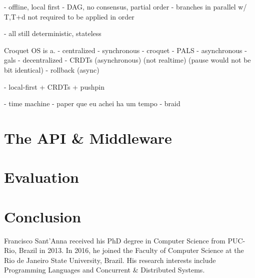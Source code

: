 \documentclass[10pt,journal,compsoc]{IEEEtran}
\begin{document}
- offline, local first
- DAG, no consensus, partial order
    - branches in parallel w/ T,T+d not required to be applied in order

- all still deterministic, stateless


Croquet OS is a.
- centralized
    - synchronous
        - croquet
	- PALS
    - asynchronous
        - gals
- decentralized
    - CRDTs (asynchronous) (not realtime) (pause would not be bit identical)
    - rollback (async)

- local-first + CRDTs + pushpin

- time machine
    - paper que eu achei ha um tempo
    - braid

\section{The API \& Middleware}
\label{sec.conclusion}

\section{Evaluation}
\label{sec.conclusion}

\section{Conclusion}
\label{sec.conclusion}




\begin{IEEEbiography}{Francisco Sant'Anna}
received his PhD degree in Computer Science from PUC-Rio, Brazil in
2013.
In 2016, he joined the Faculty of Computer Science at the Rio de Janeiro State
University, Brazil.
His research interests include Programming Languages and Concurrent \&
Distributed Systems.
\end{IEEEbiography}
\end{document}
